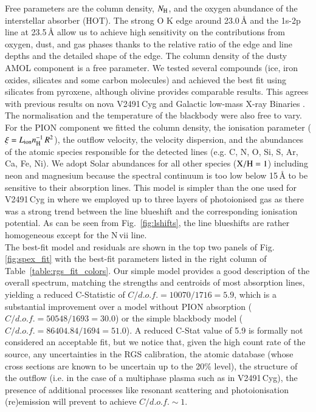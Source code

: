 \documentclass{aa}
\begin{document}
Free parameters are the column density, $N_{\rm H}$, and the oxygen abundance of the interstellar
absorber ({\scriptsize{HOT}}). The strong O K edge around 23.0\,{\AA} and the 1s-2p line at 23.5\,{\AA}
allow us to achieve high sensitivity on the contributions from oxygen, dust, and gas phases thanks to the
relative ratio of the edge and line depths and the detailed shape of the edge. The column density of the
dusty {\scriptsize{AMOL}} component is a free parameter. We tested several compounds (ice, iron
oxides, silicates and some carbon molecules) and achieved the best fit using silicates from pyroxene,
although olivine provides comparable results. This agrees with previous results on nova V2491\,Cyg and
Galactic low-mass X-ray Binaries \citep{pinto12,Pinto2013}. The normalisation and the temperature of the
blackbody were also free to vary. For the {\scriptsize{PION}} component we fitted the column density,
the ionisation parameter ($\xi = L_{\rm ion} n_{\rm H}^{-1} \, R^2$), the outflow velocity, the velocity
dispersion, and the abundances of the atomic species responsible for the detected lines (e.g. C, N,
O, Si, S, Ar, Ca, Fe, Ni). We adopt Solar abundances for all other species (${\rm X/H}=1$) including
neon and magnesium because the spectral continuum is too low below 15\,{\AA} to be sensitive to their
absorption lines. This model is simpler than the one used for V2491\,Cyg in \cite{pinto12}
where we employed up to three layers of photoionised gas as there was a strong trend between the
line blueshift and the corresponding ionisation potential. As can be seen from Fig.~\ref{fig:lshifts},
the line blueshifts are rather homogeneous except for the N\,{\sc vii} line.\\

The best-fit model and residuals are shown in the top two panels of Fig.\,\ref{fig:spex_fit} with
the best-fit parameters listed in the right column of Table~\ref{table:rgs_fit_colors}. Our simple
model provides a good description of the overall spectrum, matching the strengths and centroids of
most absorption lines, yielding a reduced C-Statistic of $C/d.o.f.=10070/1716=5.9$, which is a
substantial improvement over a model without {\scriptsize{PION}} absorption
($C/d.o.f.=50548/1693=30.0$) or the simple blackbody model ($C/d.o.f.=86404.84/1694=51.0$).
A reduced C-Stat
value of 5.9 is formally not considered an acceptable fit, but we notice that, given the high
count rate of the source, any uncertainties in the RGS calibration, the atomic database (whose
cross sections are known to be uncertain up to the 20\% level), the structure of the outflow
(i.e. in the case of a multiphase plasma such as in V2491\,Cyg), the presence of additional
processes like resonant scattering and photoionisation (re)emission will prevent to achieve
$C/d.o.f.\sim1$.\\
\end{document}

